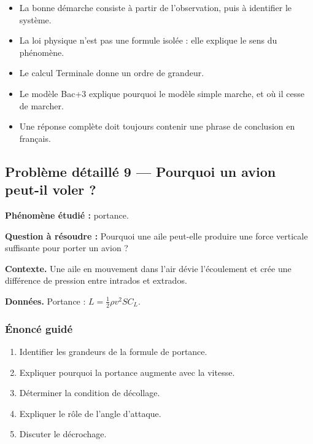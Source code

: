\documentclass[11pt,a4paper]{article}
\begin{document}
\begin{methodebox}
\begin{itemize}
  \item La bonne démarche consiste à partir de l'observation, puis à identifier le système.
  \item La loi physique n'est pas une formule isolée : elle explique le sens du phénomène.
  \item Le calcul Terminale donne un ordre de grandeur.
  \item Le modèle Bac+3 explique pourquoi le modèle simple marche, et où il cesse de marcher.
  \item Une réponse complète doit toujours contenir une phrase de conclusion en français.
\end{itemize}
\end{methodebox}

\subsection{Problème détaillé 9 — Pourquoi un avion peut-il voler ?}

\begin{exercicebox}
\textbf{Phénomène étudié :} portance.

\medskip
\textbf{Question à résoudre :} Pourquoi une aile peut-elle produire une force verticale suffisante pour porter un avion ?

\medskip
\textbf{Contexte.} Une aile en mouvement dans l'air dévie l'écoulement et crée une différence de pression entre intrados et extrados.

\medskip
\textbf{Données.} Portance : \(L=\frac12\rho v^2SC_L\).
\end{exercicebox}

\subsubsection*{Énoncé guidé}

\begin{enumerate}
  \item Identifier les grandeurs de la formule de portance.
  \item Expliquer pourquoi la portance augmente avec la vitesse.
  \item Déterminer la condition de décollage.
  \item Expliquer le rôle de l'angle d'attaque.
  \item Discuter le décrochage.
\end{enumerate}
\end{document}
